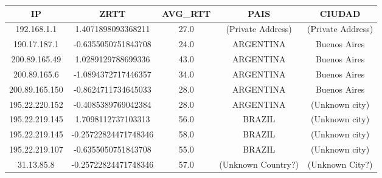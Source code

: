 \begin{tabular}{|c@{\hspace{5ex}}c@{\hspace{5ex}}c@{\hspace{5ex}}c@{\hspace{5ex}}c|}
 \hline
 \rule{0pt}{1.2em}IP & ZRTT & AVG\_RTT & PAIS & CIUDAD\\[0.2em]
 \hline

\rule{0pt}{1.2em} 192.168.1.1  &  1.4071898093368211 & 27.0 & (Private Address) & (Private Address) \\[0.2em]
\rule{0pt}{1.2em} 190.17.187.1  &  -0.6355050751843708 & 24.0 & ARGENTINA & Buenos Aires \\[0.2em]
\rule{0pt}{1.2em} 200.89.165.49  &  1.0289129788699336 & 43.0 & ARGENTINA & Buenos Aires \\[0.2em]
\rule{0pt}{1.2em} 200.89.165.6  &  -1.0894372717446357 & 34.0 & ARGENTINA & Buenos Aires \\[0.2em]
\rule{0pt}{1.2em} 200.89.165.150  &  -0.8624711734645033 & 28.0 & ARGENTINA & Buenos Aires \\[0.2em]
\rule{0pt}{1.2em} 195.22.220.152  &  -0.4085389769042384 & 28.0 & ARGENTINA & (Unknown city) \\[0.2em]
\rule{0pt}{1.2em} 195.22.219.145  &  1.7098112737103313 & 56.0 & BRAZIL & (Unknown city) \\[0.2em]
\rule{0pt}{1.2em} 195.22.219.145  &  -0.25722824471748346 & 58.0 & BRAZIL & (Unknown city) \\[0.2em]
\rule{0pt}{1.2em} 195.22.219.107  &  -0.6355050751843708 & 55.0 & BRAZIL & (Unknown city) \\[0.2em]
\rule{0pt}{1.2em} 31.13.85.8  &  -0.25722824471748346 & 57.0 & (Unknown Country?) & (Unknown City?) \\[0.2em]
\hline
 \end{tabular}